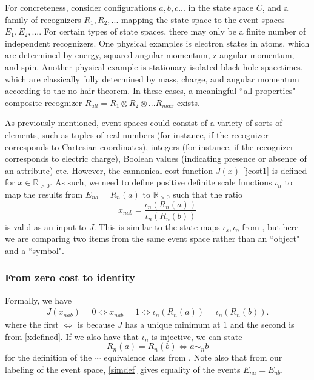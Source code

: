 \documentclass[11pt,a4paper]{article}
\begin{document}
For concreteness, consider configurations $a,b,c...$ in the state space $C$, and a family of recognizers $R_1,R_2,...$ mapping the state space to the event spaces $E_1,E_2,...$.
 For certain types of state spaces, there may only be a finite number of independent recognizers. One physical examples is electron states in atoms, which are determined by energy, squared angular momentum, z angular momentum, and spin. Another physical example is stationary isolated black hole spacetimes, which are classically fully determined by mass, charge, and angular momentum according to the no hair theorem. In these cases, a meaningful ``all properties" composite recognizer $R_{all}=R_1\otimes R_2\otimes...R_{max}$ exists.

As previously mentioned, event spaces could consist of a variety of sorts of elements, such as tuples of real numbers (for instance, if the recognizer corresponds to Cartesian coordinates), integers (for instance, if the recognizer corresponds to electric charge), Boolean values (indicating presence or absence of an attribute) etc. However, the cannonical cost function $J(x)$ \ref{jcost1} is defined for $x\in\mathbb{R}_{>0}$. As such, we need to define positive definite scale  functions $\iota_n$ to map the results from $E_{na}=R_n(a)$ to $\mathbb{R}_{>0}$ such that the ratio 
\begin{equation}
 x_{nab}=\frac{\iota_n(R_n(a))}{\iota_n(R_n(b))}   \label{xdefined}
\end{equation} 
is valid as an input to $J$. This is similar to the state maps $\iota_s,\iota_o$ from \cite{EntropyInterface}, but here we are comparing two items from the same event space rather than an ``object" and a ``symbol". 
\subsubsection{From zero cost to identity}
Formally, we have
\begin{align}
    J(x_{nab})=0\Leftrightarrow x_{nab}=1 \Leftrightarrow \iota_n(R_n(a))=\iota_n(R_n(b)). \label{triplestatement}
\end{align}
where the first $\Leftrightarrow$ is because $J$ has a unique minimum at $1$ and the second is from \ref{xdefined}. If we also have that $\iota_n$ is injective, we can state
\begin{equation}
    R_n(a)=R_n(b)\Leftrightarrow a\sim_n b \label{simdef}
\end{equation}
for the definition of the $\sim$ equivalence class from \cite{RecognitionGeometry}. Note also that from our labeling of the event space, \ref{simdef}  gives equality of the events $E_{na}=E_{nb}$.
\end{document}
